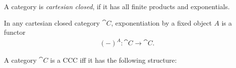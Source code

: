 \documentclass{article}
\begin{document}
\begin{definition}[Awodey p. 122]
    A category is \emph{cartesian closed}, if it has all finite
    products and exponentials.
\end{definition}

\begin{proposition}[Awodey p. 126]
    In any cartesian closed category $\cat C$, exponentiation by a
    fixed object $A$ is a functor
    \begin{align*}
        (-)^A:\cat C\to\cat C.
    \end{align*} 
\end{proposition}

\begin{proposition}[Awodey p. 134]
    A category $\cat C$ is a CCC iff it has the following structure:
    

\end{proposition}
\end{document}
